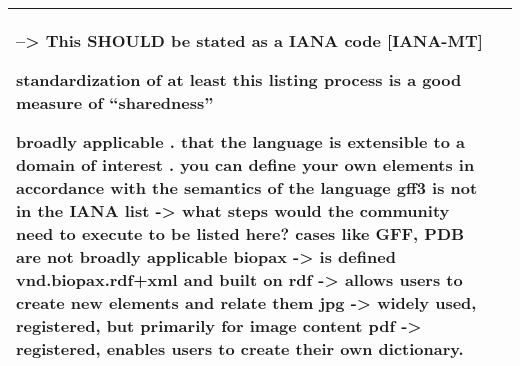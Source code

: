 \documentclass[english]{article}
\begin{document}
\begin{longtable}{|p{5cm}|p{9cm}|}
--> This SHOULD be stated as a IANA code [IANA-MT]\newline 


standardization of at least this listing process is a good measure of “sharedness”\newline 

broadly applicable\newline 
. that the language is extensible to a domain of interest\newline 
. you can define your own elements in accordance with the semantics of the language\newline 
\newline 
gff3 is not in the IANA list -> what steps would the community need to execute to be listed here?
cases like GFF, PDB are not broadly applicable \newline 
biopax -> is defined vnd.biopax.rdf+xml and built on rdf -> allows users to create new elements and relate them \newline 
jpg -> widely used, registered, but primarily for image content\newline 
pdf -> registered, enables users to create their own dictionary.\newline 
 

\\
\hline

\end{longtable}
\end{document}
